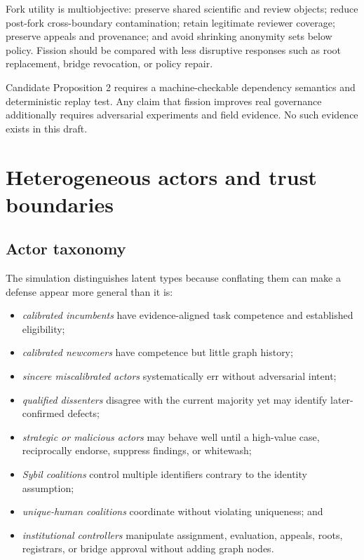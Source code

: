 \documentclass[11pt]{article}
\begin{document}
Fork utility is multiobjective: preserve shared scientific and review objects; reduce post-fork cross-boundary contamination; retain legitimate reviewer coverage; preserve appeals and provenance; and avoid shrinking anonymity sets below policy.  Fission should be compared with less disruptive responses such as root replacement, bridge revocation, or policy repair.

\begin{evidencegate}
Candidate Proposition 2 requires a machine-checkable dependency semantics and deterministic replay test.  Any claim that fission improves real governance additionally requires adversarial experiments and field evidence.  No such evidence exists in this draft.
\end{evidencegate}

\section{Heterogeneous actors and trust boundaries}

\subsection{Actor taxonomy}

The simulation distinguishes latent types because conflating them can make a defense appear more general than it is:
\begin{itemize}
 \item \emph{calibrated incumbents} have evidence-aligned task competence and established eligibility;
 \item \emph{calibrated newcomers} have competence but little graph history;
 \item \emph{sincere miscalibrated actors} systematically err without adversarial intent;
 \item \emph{qualified dissenters} disagree with the current majority yet may identify later-confirmed defects;
 \item \emph{strategic or malicious actors} may behave well until a high-value case, reciprocally endorse, suppress findings, or whitewash;
 \item \emph{Sybil coalitions} control multiple identifiers contrary to the identity assumption;
 \item \emph{unique-human coalitions} coordinate without violating uniqueness; and
 \item \emph{institutional controllers} manipulate assignment, evaluation, appeals, roots, registrars, or bridge approval without adding graph nodes.
\end{itemize}
\end{document}
